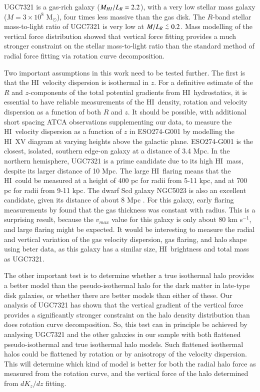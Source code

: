 \documentclass[traditabstract]{aa} %
\newcommand\lesim{\lower.5ex\hbox{$\; \buildrel < \over \sim \;$}}
\newcommand\HI{H{\small I}}
\newcommand\kms{km s$^{-1}$}
\newcommand\msun{M$_{\odot }$}
\begin{document}
UGC7321 is a gas-rich galaxy ($M_{\HI}/L_R=2.2$), with a very low stellar
mass galaxy ($M=3\times10^8$ \msun), four times less massive than the
gas disk. The $R$-band stellar mass-to-light ratio of UGC7321 is very
low at $M/L_R\lesim0.2$. Mass modelling of the vertical force
distribution showed that vertical force fitting provides a much
stronger constraint on the stellar mass-to-light ratio than the
standard method of radial force fitting via rotation curve
decomposition.

Two important assumptions in this work need to be tested further.
The first is that the \HI\ velocity dispersion is isothermal in
$z$. For a definitive estimate of the $R$ and $z$-components of the
total potential gradients from \HI\ hydrostatics, it is essential
to have reliable measurements of the \HI\ density, rotation and
velocity dispersion as a function of both $R$ and $z$.  It should
be possible, with additional short spacing ATCA observations
supplementing our data, to measure the \HI\ velocity dispersion as
a function of $z$ in ESO274-G001 by modelling the \HI\ XV diagram
at varying heights above the galactic plane.  ESO274-G001 is the
closest, isolated, southern edge-on galaxy at a distance of 3.4
Mpc.  In the northern hemisphere, UGC7321 is a prime candidate due
to its high \HI\ mass, despite its larger distance of 10 Mpc.  The
large \HI\ flaring means that the \HI\ could be measured at a height
of 400 pc for radii from 5-11 kpc, and at 700 pc for radii from
9-11 kpc.  The dwarf Scd galaxy NGC5023 is also an excellent
candidate, given its distance of about 8 Mpc \citep{vdks1982a}.
For this galaxy, early flaring measurements by \citet{bsvdk1986}
found that the gas thickness was constant with radius. This is a
surprising result, because the $v_{max}$ value for this galaxy is
only about $80$ \kms, and large flaring might be expected.  It would
be interesting to measure the radial and vertical variation of the
gas velocity dispersion, gas flaring, and halo shape using beter
data, as this galaxy has a similar size, \HI\ brightness and total
mass as UGC7321.

The other important test is to determine whether a true isothermal
halo provides a better model than the pseudo-isothermal halo for
the dark matter in late-type disk galaxies, or whether there are
better models than either of these.  Our analysis of UGC7321
has shown that the vertical gradient of the vertical force provides
a significantly stronger constraint on the halo density distribution
than does rotation curve decomposition. So, this test can in principle
be achieved by analysing UGC7321 and the other galaxies in
our sample with both flattened pseudo-isothermal and true isothermal
halo models. Such flattened isothermal halos could be flattened by
rotation or by anisotropy of the velocity dispersion.  This will
determine which kind of model is better for both the radial halo
force as measured from the rotation curve, and the vertical force
of the halo determined from $dK_z/dz$ fitting.
\end{document}
